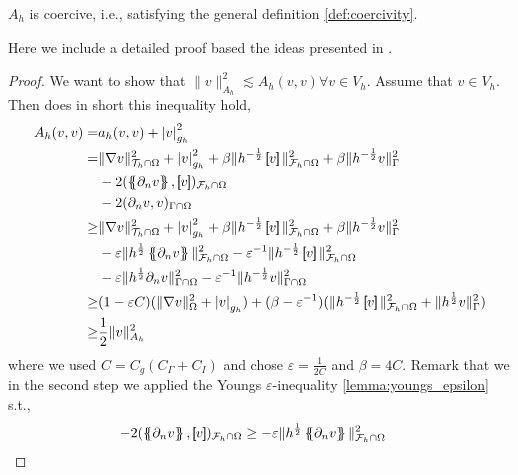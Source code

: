 \begin{lemma}
    $A_{h}$ is coercive, i.e., satisfying the general definition \ref{def:coercivity}.
\end{lemma}
    Here we include a detailed proof based the ideas presented in \cite{gurkan2019stabilized}.
\begin{proof}
We want to show that $  \| v \|_{A_{h}}^{2}   \lesssim A_{h}( v,v) \forall v \in V_{h} $.
    Assume that $v \in V_{h} $. Then does in short this inequality hold,
\[
    \begin{split}
A_{h}( v, v)   =& a_{h}( v, v) + \abs{ v }  _{g_{h}}^{2} \\
=&  \| \nabla v \|_{  \mathcal{T}_{h} \cap \Omega }^{ 2 } + \abs{v  }  _{ g_{h} }^{ 2 } + \beta \| h^{-\frac{1}{2}} \jump{ v }   \|_{\mathcal{F} _{h} \cap \Omega   }^{  2}   + \beta \| h^{-\frac{1}{2}}  v    \|_{ \Gamma}^{  2}
\\ & - 2( \mean{ \partial _{n} v  },  \jump{ v })_{\mathcal{F} _{h} \cap \Omega }
\\ & - 2 ( \partial _{n} v,v)_{\Gamma \cap \Omega }     \\
\ge  &  \| \nabla v \|_{  \mathcal{T}_{h} \cap \Omega }^{ 2 } + \left\lvert v \right\rvert_{ g_{h} }^{ 2 } + \beta \| h^{-\frac{1}{2}} \jump{ v }   \|_{\mathcal{F} _{h} \cap \Omega   }^{2  }   + \beta \| h^{-\frac{1}{2}}  v    \|_{ \Gamma}^{  2}
\\ & - \varepsilon \| h^{\frac{1}{2}}  \mean{  \partial _{n} v}      \|_{ \mathcal{F} _{h} \cap \Omega  }^{2  } - \varepsilon ^{-1} \| h^{-\frac{1}{2}} \jump{ v }   \|_{\mathcal{F} _{h} \cap \Omega   }^{ 2 }
\\ & - \varepsilon \| h^{\frac{1}{2}} \partial _{n} v \|_{ \Gamma \cap \Omega  }^{2  } -  \varepsilon ^{-1} \| h^{-\frac{1}{2}} v \|_{  \Gamma \cap  \Omega }^{ 2 } \\
\ge & ( 1-\varepsilon C)  ( \| \nabla v \|_{\Omega   }^{2  } + \left\lvert v \right\rvert _{g_{h}}   ) + ( \beta - \varepsilon ^{-1} ) ( \| h^{-\frac{1}{2}} \jump{ v }   \|_{ \mathcal{F} _{h}\cap  \Omega  }^{ 2 } + \| h^{\frac{1}{2}} v \|_{\Gamma
}^{  2}  )    \\
\ge & \frac{1}{2} \| v \|_{ A_{h} }^{ 2 }
    \end{split}
\]
where we used $C= C_{g} ( C_{\Gamma } + C_{I}) $ and chose $\varepsilon = \frac{1}{2C}$ and $\beta  = 4C$.
Remark that we in the second step we applied the Youngs $\varepsilon $-inequality \ref{lemma:youngs_epsilon} s.t.,
 \[
     \begin{split}
         - 2( \mean{ \partial _{n} v  },  \jump{ v })_{\mathcal{F} _{h} \cap \Omega } &\ge - \varepsilon \| h^{\frac{1}{2}}  \mean{  \partial _{n} v}      \|_{ \mathcal{F} _{h} \cap \Omega  }^{2  }

\end{split}\]
\end{proof}
